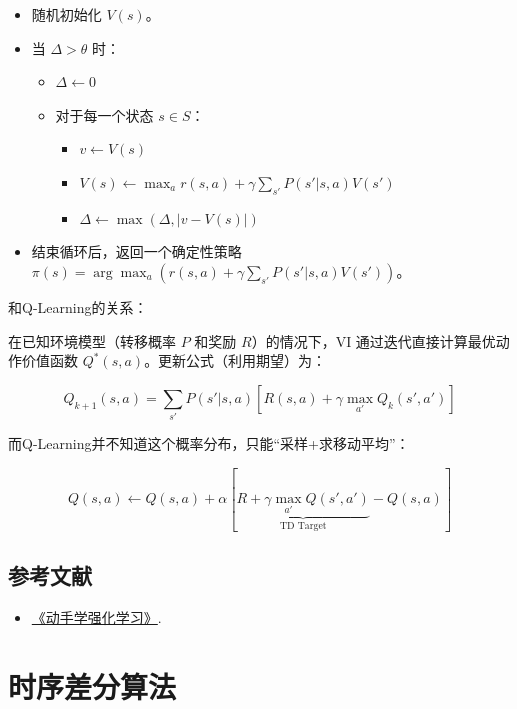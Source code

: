 \begin{itemize}
\tightlist
\item
  随机初始化 \(V(s)\)。
\item
  当 \(\Delta>\theta\) 时：

  \begin{itemize}
  \tightlist
  \item
    \(\Delta\leftarrow 0\)
  \item
    对于每一个状态 \(s\in S\)：

    \begin{itemize}
    \tightlist
    \item
      \(v\leftarrow V(s)\)
    \item
      \(V(s)\leftarrow \max_a r(s,a)+\gamma\sum_{s'}P(s'|s,a)V(s')\)
    \item
      \(\Delta\leftarrow \max(\Delta,|v-V(s)|)\)
    \end{itemize}
  \end{itemize}
\item
  结束循环后，返回一个确定性策略 \(\pi(s)=\arg\max_a(r(s,a)+\gamma\sum_{s'}P(s'|s,a)V(s'))\)。
\end{itemize}

和Q-Learning的关系：

在已知环境模型（转移概率 \(P\) 和奖励 \(R\)）的情况下，VI 通过迭代直接计算最优动作价值函数 \(Q^{*}(s,a)\)。更新公式（利用期望）为：

\[
Q_{k+1}(s,a)=\sum_{s'}P(s'|s,a)[R(s,a)+\gamma\max_{a'}Q_k(s',a')]
\]

而Q-Learning并不知道这个概率分布，只能``采样+求移动平均''：

\[
Q(s,a)\leftarrow Q(s,a)+\alpha[\underbrace{R+\gamma\max_{a'}Q(s',a')}_{\text{TD Target}}-Q(s,a)]
\]

\hypertarget{ux53c2ux8003ux6587ux732e-47}{%
\subsection{参考文献}\label{ux53c2ux8003ux6587ux732e-47}}

\vspace{0.25em}
\begin{itemize}
\tightlist
\item
  \href{https://hrl.boyuai.com/}{《动手学强化学习》}.
\end{itemize}

\clearpage

\hypertarget{ux65f6ux5e8fux5deeux5206ux7b97ux6cd5}{%
\section{时序差分算法}\label{ux65f6ux5e8fux5deeux5206ux7b97ux6cd5}}

